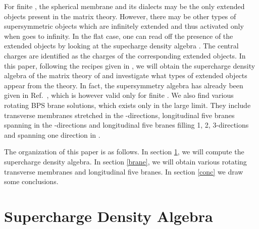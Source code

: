 \documentclass[a4paper,12pt]{article}
\begin{document}
For finite \coordHE{}, the spherical membrane and its dialects may be the
only extended objects present in the matrix theory.  However,
there may be other types of supersymmetric objects which are
infinitely extended and thus activated only when \coordHE{} goes to
infinity.  In the flat case, one can read off the presence of the
extended objects by looking at the supecharge density algebra
\cite{ban157}.  The central charges are identified as the charges
of the corresponding extended objects.  In this paper, following
the recipes given in \cite{ban157}, we will obtain the supercharge
density algebra of the matrix theory of \cite{ber021,das185} and
investigate what types of extended objects appear from the theory.
In fact, the supersymmetry algebra has already been given in
Ref.~\cite{das185}, which is however valid only for finite \coordHE{}. We
also find various rotating BPS brane solutions, which exists only
in the large \coordHE{} limit. They include transverse membranes
stretched in the \coordHE{}-directions, longitudinal five branes
spanning in the \coordHE{}-directions and longitudinal five branes
filling 1, 2, 3-directions and spanning one direction in \coordHE{}.

The organization of this paper is as follows.  In section
\ref{alg}, we will compute the supercharge density algebra. In
section \ref{brane}, we will obtain various rotating transverse
membranes and longitudinal five branes. In section \ref{conc} we
draw some conclusions.



\section{Supercharge Density Algebra}
\label{alg}
\end{document}
